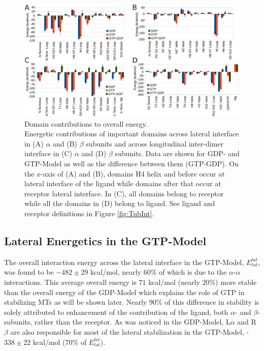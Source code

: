 \documentclass[11pt]{report}
\begin{document}
\begin{figure}[h]
  \centering
  \includegraphics[width=0.99\linewidth]{images/Fig4.pdf}
  \caption[Domain contributions to overall energy]{{Domain contributions to overall energy.}
  \\
  Energetic contributions of important domains across lateral interface
  in (A) $\alpha$ and (B) $\beta$ subunits and 
  across longitudinal inter-dimer interface in (C) $\alpha$ and (D) $\beta$
  subunits. Data are shown
  for GDP- and GTP-Model as well as the difference between them (GTP-GDP). On the $x$-axis of (A) and (B), domains H4 helix and before occur at lateral interface of the
  ligand while domains after that 
  occur at receptor lateral interface. In (C), all
  domains belong to receptor while all the domains in
  (D) belong to ligand.
  See ligand and receptor definitions in Figure 
  \ref{fig:TubInt}.}
  \label{fig:DomainsLat}
\end{figure}

\subsection{Lateral Energetics in the GTP-Model}
The overall interaction energy across
the lateral interface in the GTP-Model, $E_{tot}^{lat}$, was found to be $-482\pm29$ kcal/mol, nearly 60\% of which 
is due to the $\alpha$-$\alpha$ interactions.
This average overall energy is $71$ kcal/mol (nearly 20\%) more stable than 
the overall energy of the GDP-Model which explains the role of GTP
in stabilizing MTs as will
be shown later. Nearly 90\% of this difference in
stability is solely attributed to 
enhancement of the contribution of the ligand, 
both $\alpha$- and $\beta$-subunits, rather
than the receptor. 
As was noticed in the
GDP-Model, L$\alpha$ and R$\beta$ are also
responsible for most of the lateral 
stabilization in the GTP-Model, -$338\pm22$ kcal/mol (70\% of $E_{tot}^{lat}$).
\end{document}
